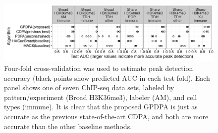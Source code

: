 \documentclass[twoside,11pt]{article}
\begin{document}


\begin{figure}[t!]
  \centering 
  \includegraphics[width=\textwidth]{figure-all-cv}
  \vskip -0.5cm
  \caption{Four-fold cross-validation was used to estimate peak
    detection accuracy (black points show predicted
    AUC in each test fold). Each panel shows one of seven ChIP-seq data
    sets, labeled by pattern/experiment (Broad H3K36me3), labeler
    (AM), and cell types (immune).  It is clear that the proposed
    GPDPA is just as accurate as the previous state-of-the-art CDPA,
    and both are more accurate than the other baseline methods.
  }
  \label{fig:test-auc}
\end{figure}

\end{document}
